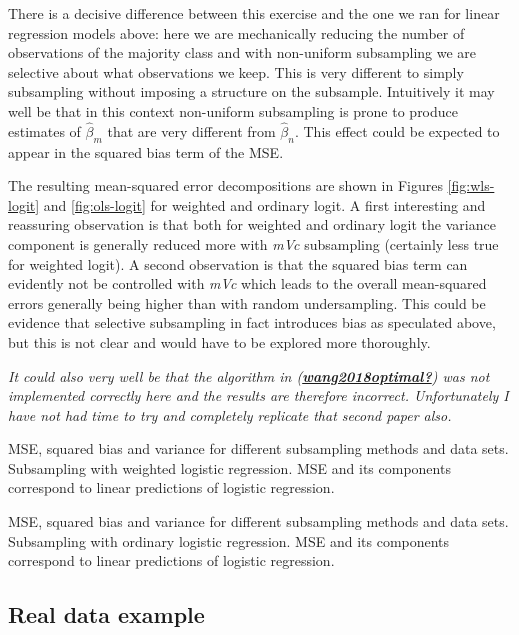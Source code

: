 \documentclass[
]{book}
\begin{document}
There is a decisive difference between this exercise and the one we ran for linear regression models above: here we are mechanically reducing the number of observations of the majority class and with non-uniform subsampling we are selective about what observations we keep. This is very different to simply subsampling without imposing a structure on the subsample. Intuitively it may well be that in this context non-uniform subsampling is prone to produce estimates of \(\hat\beta_m\) that are very different from \(\hat\beta_n\). This effect could be expected to appear in the squared bias term of the MSE.

The resulting mean-squared error decompositions are shown in Figures \ref{fig:wls-logit} and \ref{fig:ols-logit} for weighted and ordinary logit. A first interesting and reassuring observation is that both for weighted and ordinary logit the variance component is generally reduced more with \emph{mVc} subsampling (certainly less true for weighted logit). A second observation is that the squared bias term can evidently not be controlled with \emph{mVc} which leads to the overall mean-squared errors generally being higher than with random undersampling. This could be evidence that selective subsampling in fact introduces bias as speculated above, but this is not clear and would have to be explored more thoroughly.

\emph{It could also very well be that the algorithm in (\protect\hyperlink{ref-wang2018optimal}{\textbf{wang2018optimal?}}) was not implemented correctly here and the results are therefore incorrect. Unfortunately I have not had time to try and completely replicate that second paper also.}

\hypertarget{htmlwidget-0246f228df2813ded3c2}{}

\label{fig:wls-logit}MSE, squared bias and variance for different subsampling methods and data sets. Subsampling with weighted logistic regression. MSE and its components correspond to linear predictions of logistic regression.

\hypertarget{htmlwidget-cdc8bfd7b217477475d2}{}

\label{fig:ols-logit}MSE, squared bias and variance for different subsampling methods and data sets. Subsampling with ordinary logistic regression. MSE and its components correspond to linear predictions of logistic regression.

\hypertarget{real-data-example}{%
\subsection{Real data example}\label{real-data-example}}
\end{document}
